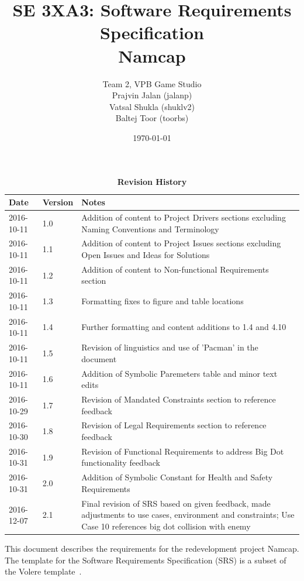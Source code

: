 \documentclass[12pt, titlepage]{article}
\title{SE 3XA3: Software Requirements Specification\\Namcap}
\author{Team 2, VPB Game Studio
		\\ Prajvin Jalan (jalanp)
		\\ Vatsal Shukla (shuklv2)
		\\ Baltej Toor (toorbs)
}
\date{\today}
\begin{document}
\maketitle

\tableofcontents
\listoftables
\listoffigures

\newpage

\begin{table}[H]
\caption{\bf Revision History}
\begin{tabularx}{\textwidth}{p{3cm}p{2cm}X}
\toprule {\bf Date} & {\bf Version} & {\bf Notes}\\
\midrule
2016-10-11 & 1.0 & Addition of content to Project Drivers sections excluding Naming Conventions and Terminology\\
2016-10-11 & 1.1 & Addition of content to Project Issues sections excluding Open Issues and Ideas for Solutions\\
2016-10-11 & 1.2 & Addition of content to Non-functional Requirements section\\
2016-10-11 & 1.3 & Formatting fixes to figure and table locations\\
2016-10-11 & 1.4 & Further formatting and content additions to 1.4 and 4.10\\
2016-10-11 & 1.5 & Revision of linguistics and use of 'Pacman' in the document\\
2016-10-11 & 1.6 & Addition of Symbolic Paremeters table and minor text edits\\
2016-10-29 & 1.7 & Revision of Mandated Constraints section to reference feedback\\
2016-10-30 & 1.8 & Revision of Legal Requirements section to reference feedback\\
2016-10-31 & 1.9 & Revision of Functional Requirements to address Big Dot functionality feedback\\
2016-10-31 & 2.0 & Addition of Symbolic Constant for Health and Safety Requirements\\
2016-12-07 & 2.1 & Final revision of SRS based on given feedback, made adjustments to use cases, environment and constraints; Use Case 10 references big dot collision with enemy\\
\bottomrule
\end{tabularx}
\end{table}

\newpage


This document describes the requirements for the redevelopment project Namcap.  The template for the Software
Requirements Specification (SRS) is a subset of the Volere
template~\citep{RobertsonAndRobertson2012}.
\end{document}
